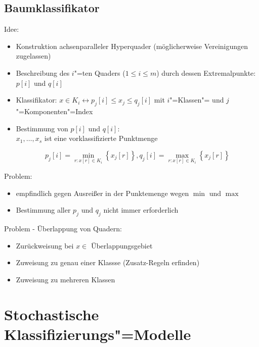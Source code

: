 \documentclass[a4paper,12pt]{scrreprt}
\begin{document}
\subsection{Baumklassifikator}
Idee:

\begin{itemize}
 \item Konstruktion achsenparalleler Hyperquader (möglicherweise
Vereinigungen zugelassen)
\item Beschreibung des $i$"=ten Quaders ($1\le i\le m$) durch dessen
Extremalpunkte: $p\left[ i \right]$ und $q\left[ i \right]$
\item Klassifikator: $x\in K_i\leftrightarrow p_j\left[ i \right]\le x_j\le
q_j\left[ i \right]$ mit $i$"=Klassen"= und $j$"=Komponenten"=Index
\item Bestimmung von $p\left[ i \right]$ und $q\left[ i \right]$:\\
$x_1,\dots,x_s$ ist eine vorklassifizierte Punktmenge\\
\begin{large}
$$p_j\left[ i \right]= \min\limits_{r: x\left[r \right]\in
K_i}\left\{ x_j\left[ r\right] \right\}, 
q_j\left[ i \right]= \max\limits_{r: x\left[r \right]\in
K_i}\left\{ x_j\left[ r\right] \right\}$$ 
\end{large}
\end{itemize}
Problem: 
\begin{itemize}
  \item empfindlich gegen Ausreißer in der Punktemenge wegen $\min$ und $\max$
  \item Bestimmung aller $p_j$ und $q_j$ nicht immer erforderlich
\end{itemize}
Problem - Überlappung von Quadern:
\begin{itemize}
  \item Zurückweisung bei $x \in $ Überlappungsgebiet
  \item Zuweisung zu genau einer Klassse (Zusatz-Regeln erfinden)
  \item Zuweisung zu mehreren Klassen
\end{itemize}


\section{Stochastische Klassifizierungs"=Modelle}
\end{document}
